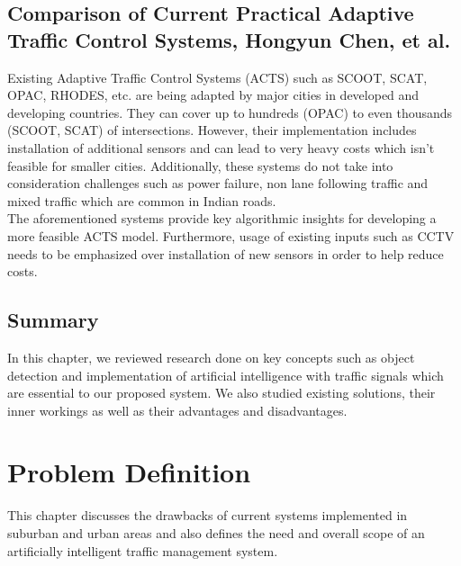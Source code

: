 \documentclass[openany,12pt]{report}
\begin{document}
\section{Comparison of Current Practical Adaptive Traffic Control Systems, Hongyun Chen, et al. \cite{paper4}}
\hspace*{0.5in}Existing Adaptive Traffic Control Systems (ACTS) such as SCOOT, SCAT, OPAC, RHODES, etc. are being adapted by major cities in developed and developing countries. They can cover up to hundreds (OPAC) to even thousands (SCOOT, SCAT) of intersections. However, their implementation includes installation of additional sensors and can lead to very heavy costs which isn't feasible for smaller cities. Additionally, these systems do not take into consideration challenges such as power failure, non lane following traffic and mixed traffic which are common in Indian roads.\\
\hspace*{0.5in}The aforementioned systems provide key algorithmic insights for developing a more feasible ACTS model. Furthermore, usage of existing inputs such as CCTV needs to be emphasized over installation of new sensors in order to help reduce costs.\\

\section{Summary}
\hspace*{0.5in}In this chapter, we reviewed research done on key concepts such as object detection and implementation of artificial intelligence with traffic signals which are essential to our proposed system. We also studied existing solutions, their inner workings as well as their advantages and disadvantages.\\



\chapter{Problem Definition}

\hspace*{0.5in}This chapter discusses the drawbacks of current systems implemented in suburban and urban areas and also defines the need and overall scope of an artificially intelligent traffic management system.\\
\end{document}
